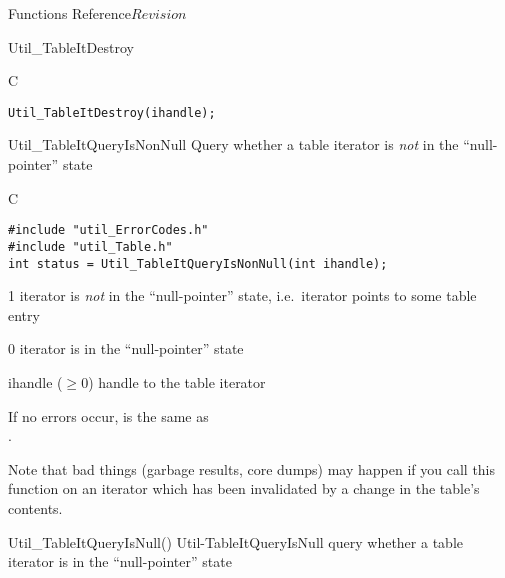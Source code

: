 \begin{cactuspart}{ Functions Reference}{}{$Revision$}
\begin{FunctionDescription}{Util\_TableItDestroy}
\begin{ExampleSection}
\begin{Example}{C}
\begin{verbatim}
Util_TableItDestroy(ihandle);
\end{verbatim}
\end{Example}
\end{ExampleSection}
\end{FunctionDescription}


\begin{FunctionDescription}{Util\_TableItQueryIsNonNull}
\label{Util-TableItQueryIsNonNull}
Query whether a table iterator is {\em not\/} in the ``null-pointer'' state

\begin{SynopsisSection}
\begin{Synopsis}{C}
\begin{verbatim}
#include "util_ErrorCodes.h"
#include "util_Table.h"
int status = Util_TableItQueryIsNonNull(int ihandle);
\end{verbatim}
\end{Synopsis}
\end{SynopsisSection}

\begin{ResultSection}
\begin{Result}{\rm 1}
iterator is {\em not\/} in the ``null-pointer'' state,
i.e.\ iterator points to some table entry
\end{Result}
\begin{Result}{\rm 0}
iterator is in the ``null-pointer'' state
\end{Result}
\end{ResultSection}

\begin{ParameterSection}
\begin{Parameter}{ihandle ($\ge 0$)}
handle to the table iterator
\end{Parameter}
\end{ParameterSection}

\begin{Discussion}
If no errors occur,
is the same as\\
.

Note that bad things (garbage results, core dumps) may happen if
you call this function on an iterator which has been invalidated
by a change in the table's contents.
\end{Discussion}

\begin{SeeAlsoSection}
\begin{SeeAlso2} {Util\_TableItQueryIsNull()} {Util-TableItQueryIsNull}
query whether a table iterator is in the ``null-pointer'' state
\end{SeeAlso2}
\end{SeeAlsoSection}


\end{FunctionDescription}
\end{cactuspart}
